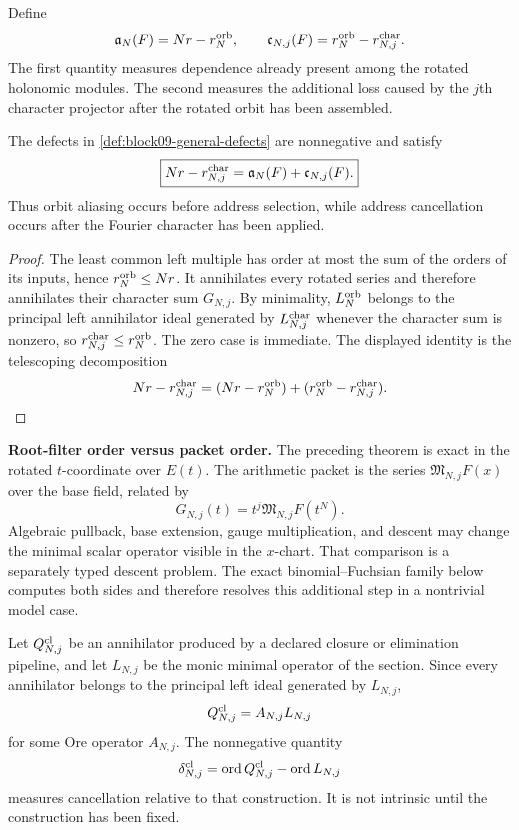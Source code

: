 \begin{definition}
\label{def:block09-general-defects}
Define
\[
 \mathfrak a_N(F)=Nr-r_N^{\rm orb},
 \qquad
 \mathfrak c_{N,j}(F)=r_N^{\rm orb}-r_{N,j}^{\rm char}.
\]
The first quantity measures dependence already present among the rotated holonomic modules.  The second measures the additional loss caused by the $j$th character projector after the rotated orbit has been assembled.
\end{definition}

\begin{theorem}
\label{thm:block09-general-defect-identity}
The defects in \cref{def:block09-general-defects} are nonnegative and satisfy
\[
 \boxed{
 Nr-r_{N,j}^{\rm char}
 =
 \mathfrak a_N(F)+\mathfrak c_{N,j}(F).}
\]
Thus orbit aliasing occurs before address selection, while address cancellation occurs after the Fourier character has been applied.
\end{theorem}

\begin{proof}
The least common left multiple has order at most the sum of the orders of its inputs, hence $r_N^{\rm orb}\leq Nr$.  It annihilates every rotated series and therefore annihilates their character sum $G_{N,j}$.  By minimality, $L_N^{\rm orb}$ belongs to the principal left annihilator ideal generated by $L_{N,j}^{\rm char}$ whenever the character sum is nonzero, so $r_{N,j}^{\rm char}\leq r_N^{\rm orb}$.  The zero case is immediate.  The displayed identity is the telescoping decomposition
\[
 Nr-r_{N,j}^{\rm char}
 =
 (Nr-r_N^{\rm orb})+(r_N^{\rm orb}-r_{N,j}^{\rm char}).
\]
\end{proof}

\begin{boundarybox}
\textbf{Root-filter order versus packet order.}
The preceding theorem is exact in the rotated $t$-coordinate over $E(t)$.  The arithmetic packet is the series $\mathfrak M_{N,j}F(x)$ over the base field, related by
\[
 G_{N,j}(t)=t^j\mathfrak M_{N,j}F(t^N).
\]
Algebraic pullback, base extension, gauge multiplication, and descent may change the minimal scalar operator visible in the $x$-chart.  That comparison is a separately typed descent problem.  The exact binomial--Fuchsian family below computes both sides and therefore resolves this additional step in a nontrivial model case.
\end{boundarybox}

Let $Q^{\rm cl}_{N,j}$ be an annihilator produced by a declared closure or elimination pipeline, and let $L_{N,j}$ be the monic minimal operator of the section.  Since every annihilator belongs to the principal left ideal generated by $L_{N,j}$,
\[
 Q^{\rm cl}_{N,j}=A_{N,j}L_{N,j}
\]
for some Ore operator $A_{N,j}$.  The nonnegative quantity
\[
 \delta^{\rm cl}_{N,j}
 =
 \operatorname{ord}Q^{\rm cl}_{N,j}
 -
 \operatorname{ord}L_{N,j}
\]
measures cancellation relative to that construction.  It is not intrinsic until the construction has been fixed.

